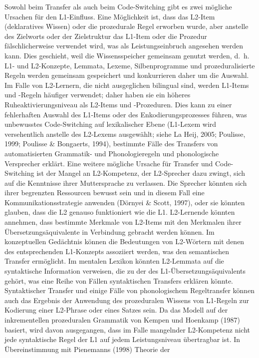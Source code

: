 \documentclass[
  letterpaper,
]{scrbook}
\begin{document}
Sowohl beim Transfer als auch beim Code-Switching gibt es zwei mögliche
Ursachen für den L1-Einfluss. Eine Möglichkeit ist, dass das L2-Item
(deklaratives Wissen) oder die prozedurale Regel erworben wurde, aber
anstelle des Zielworts oder der Zielstruktur das L1-Item oder die
Prozedur fälschlicherweise verwendet wird, was als Leistungseinbruch
angesehen werden kann. Dies geschieht, weil die Wissensspeicher
gemeinsam genutzt werden, d.~h. L1- und L2-Konzepte, Lemmata, Lexeme,
Silbenprogramme und prozeduralisierte Regeln werden gemeinsam
gespeichert und konkurrieren daher um die Auswahl. Im Falle von
L2-Lernern, die nicht ausgeglichen bilingual sind, werden L1-Items und
-Regeln häufiger verwendet; daher haben sie ein höheres
Ruheaktivierungsniveau als L2-Items und -Prozeduren. Dies kann zu einer
fehlerhaften Auswahl des L1-Items oder des Enkodierungsprozesses führen,
was unbewusstes Code-Switching auf lexikalischer Ebene (L1-Lexem wird
versehentlich anstelle des L2-Lexems ausgewählt; siehe La Heij, 2005;
Poulisse, 1999; Poulisse \& Bongaerts, 1994), bestimmte Fälle des
Transfers von automatisierten Grammatik- und Phonologieregeln und
phonologische Versprecher erklärt. Eine weitere mögliche Ursache für
Transfer und Code-Switching ist der Mangel an L2-Kompetenz, der
L2-Sprecher dazu zwingt, sich auf die Kenntnisse ihrer Muttersprache zu
verlassen. Die Sprecher könnten sich ihrer begrenzten Ressourcen bewusst
sein und in diesem Fall eine Kommunikationsstrategie anwenden (Dörnyei
\& Scott, 1997), oder sie könnten glauben, dass die L2 genauso
funktioniert wie die L1. L2-Lernende könnten annehmen, dass bestimmte
Merkmale von L2-Items mit den Merkmalen ihrer Übersetzungsäquivalente in
Verbindung gebracht werden können. Im konzeptuellen Gedächtnis können
die Bedeutungen von L2-Wörtern mit denen des entsprechenden L1-Konzepts
assoziiert werden, was den semantischen Transfer ermöglicht. Im mentalen
Lexikon könnten L2-Lemmata auf die syntaktische Information verweisen,
die zu der des L1-Übersetzungsäquivalents gehört, was eine Reihe von
Fällen syntaktischen Transfers erklären könnte. Syntaktischer Transfer
und einige Fälle von phonologischem Regeltransfer können auch das
Ergebnis der Anwendung des prozeduralen Wissens von L1-Regeln zur
Kodierung einer L2-Phrase oder eines Satzes sein. Da das Modell auf der
inkrementellen prozeduralen Grammatik von Kempen und Hoenkamp (1987)
basiert, wird davon ausgegangen, dass im Falle mangelnder L2-Kompetenz
nicht jede syntaktische Regel der L1 auf jedem Leistungsniveau
übertragbar ist. In Übereinstimmung mit Pienemanns (1998) Theorie der
\end{document}
